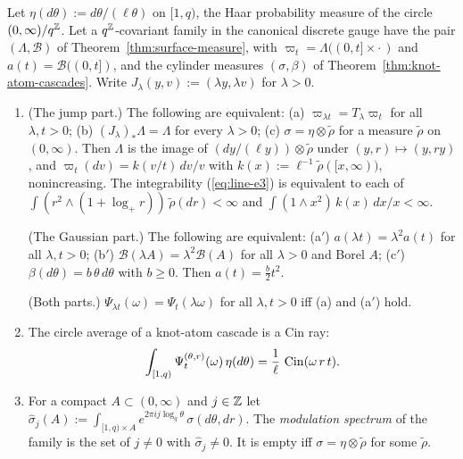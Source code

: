 \begin{proposition}
\label{prop:strata-cylinder-coordinates}

Let $\eta(d\theta) := d\theta/(\ell\theta)$ on $[1,q)$, the Haar probability measure of the circle
$(0,\infty)/q^{\mathbb{Z}}$. Let a $q^{\mathbb{Z}}$-covariant family in the canonical discrete gauge have the pair
$(\Lambda, \mathcal{B})$ of Theorem~\ref{thm:surface-measure}, with
$\varpi_t = \Lambda((0,t] \times \cdot\,)$ and $a(t) = \mathcal{B}((0,t])$, and the cylinder
measures $(\sigma, \beta)$ of Theorem~\ref{thm:knot-atom-cascades}. Write
$J_\lambda(y,v) := (\lambda y, \lambda v)$ for $\lambda > 0$.
\begin{enumerate}
\item (The jump part.) The following are equivalent: (a) $\varpi_{\lambda t} = T_\lambda\varpi_t$
for all $\lambda, t > 0$; (b) $(J_\lambda)_*\Lambda = \Lambda$ for every $\lambda > 0$;
(c) $\sigma = \eta \otimes \tilde\rho$ for a measure $\tilde\rho$ on $(0,\infty)$. Then $\Lambda$ is
the image of $(dy/(\ell y)) \otimes \tilde\rho$ under $(y,r) \mapsto (y, ry)$, and
$\varpi_t(dv) = k(v/t)\,dv/v$ with $k(x) := \ell^{-1}\tilde\rho([x,\infty))$, nonincreasing. The
integrability (\ref{eq:line-e3}) is equivalent to each of $\int(r^2 \wedge (1 + \log_+r))\,\tilde\rho(dr) < \infty$
and $\int(1 \wedge x^2)\,k(x)\,dx/x < \infty$.

(The Gaussian part.) The following are equivalent: (a$'$) $a(\lambda t) = \lambda^2a(t)$ for all
$\lambda, t > 0$; (b$'$) $\mathcal{B}(\lambda A) = \lambda^2\mathcal{B}(A)$ for all $\lambda > 0$
and Borel $A$; (c$'$) $\beta(d\theta) = b\,\theta\,d\theta$ with $b \ge 0$. Then
$a(t) = \tfrac b2t^2$.

(Both parts.) $\Psi_{\lambda t}(\omega) = \Psi_t(\lambda\omega)$ for all $\lambda, t > 0$ iff
(a) and (a$'$) hold.
\item The circle average of a knot-atom cascade is a Cin ray:
\begin{equation}\label{eq:line-e5}
  \int_{[1,q)}\Psi^{(\theta,r)}_t(\omega)\,\eta(d\theta) = \frac1\ell\,\operatorname{Cin}(\omega\,r\,t).
\end{equation}
\item For a compact $A \subset (0,\infty)$ and $j \in \mathbb{Z}$ let
$\widehat\sigma_j(A) := \int_{[1,q) \times A}e^{2\pi ij\log_q\theta}\,\sigma(d\theta,dr)$. The
\emph{modulation spectrum} of the family is the set of $j \ne 0$ with $\widehat\sigma_j \ne 0$. It
is empty iff $\sigma = \eta \otimes \tilde\rho$ for some $\tilde\rho$.
\end{enumerate}
\end{proposition}

